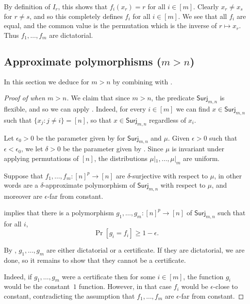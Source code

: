 \documentclass{article}
\providecommand{\Surj}{\mathsf{Surj}}
\theoremstyle{definition}
\theoremstyle{remark}
\begin{document}
By definition of $I_r$, this shows that $f_i(x_r) = r$ for all $i \in [m]$. Clearly $x_r \neq x_s$ for $r \neq s$, and so this completely defines $f_i$ for all $i \in [m]$. We see that all $f_i$ are equal, and the common value is the permutation which is the inverse of $r \mapsto x_r$. Thus $f_1,\dots,f_m$ are dictatorial.

\subsection{Approximate polymorphisms (\texorpdfstring{$m > n$}{m > n})}
\label{sec:classification-approximate-flexible}

In this section we deduce  for $m > n$ by combining  with .

\begin{proof}[Proof of  when $m > n$]
We claim that since $m > n$, the predicate $\Surj_{m,n}$ is flexible, and so we can apply . Indeed, for every $i \in [m]$ we can find $x \in \Surj_{m,n}$ such that $\{ x_j : j \neq i \} = [n]$, so that $x \in \Surj_{m,n}$ regardless of $x_i$.

Let $\epsilon_0 > 0$ be the parameter given by  for $\Surj_{m,n}$ and $\mu$.
Given $\epsilon > 0$ such that $\epsilon < \epsilon_0$, we let $\delta > 0$ be the parameter given by . Since $\mu$ is invariant under applying permutations of $[n]$, the distributions $\mu|_1,\dots,\mu|_m$ are uniform.

Suppose that $f_1,\dots,f_m\colon [n]^p \to [n]$ are $\delta$-surjective with respect to $\mu$, in other words are a $\delta$-approximate polymorphism of $\Surj_{m,n}$ with respect to $\mu$, and moreover are $\epsilon$-far from constant.

 implies that there is a polymorphism $g_1,\dots,g_m\colon [n]^p \to [n]$ of $\Surj_{m,n}$ such that for all $i$,
\[
 \Pr[g_i = f_i] \ge 1-\epsilon.
\]

By , $g_1,\dots,g_m$ are either dictatorial or a certificate. If they are dictatorial, we are done, so it remains to show that they cannot be a certificate.

Indeed, if $g_1,\dots,g_m$ were a certificate then for some $i \in [m]$, the function $g_i$ would be the constant~$1$ function. However, in that case $f_i$ would be $\epsilon$-close to constant, contradicting the assumption that $f_1,\dots,f_m$ are $\epsilon$-far from constant.
\end{proof}
\end{document}
